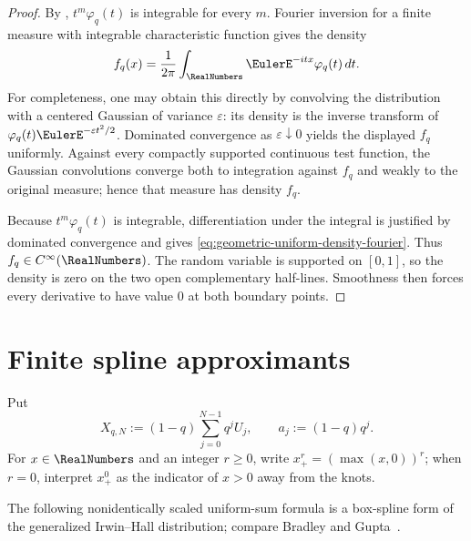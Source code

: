 \documentclass[11pt,a4paper,oneside,openany]{book}
\theoremstyle{definition}
\theoremstyle{remark}
\begin{document}
\begin{proof}
By , $t^m\varphi_q(t)$ is integrable for every $m$.  Fourier inversion for a finite measure with integrable characteristic function gives the density
\[
 f_q(x)=\frac1{2\pi}\int_{\RealNumbers}\EulerE^{-itx}\varphi_q(t)\,dt.
\]
For completeness, one may obtain this directly by convolving the distribution with a centered Gaussian of variance $\varepsilon$: its density is the inverse transform of
$\varphi_q(t)\EulerE^{-\varepsilon t^2/2}$.  Dominated convergence as
$\varepsilon\downarrow0$ yields the displayed $f_q$ uniformly.  Against every compactly supported continuous test function, the Gaussian convolutions converge both to integration against $f_q$ and weakly to the original measure; hence that measure has density $f_q$.

Because $t^m\varphi_q(t)$ is integrable, differentiation under the integral is justified by dominated convergence and gives \eqref{eq:geometric-uniform-density-fourier}.  Thus $f_q\in C^\infty(\RealNumbers)$.  The random variable is supported on $[0,1]$, so the density is zero on the two open complementary half-lines.  Smoothness then forces every derivative to have value $0$ at both boundary points.
\end{proof}

\section{Finite spline approximants}

Put
\begin{equation}\label{eq:finite-geometric-uniform-sum}
 X_{q,N}:=(1-q)\sum_{j=0}^{N-1}q^jU_j,
 \qquad
 a_j:=(1-q)q^j.
\end{equation}
For $x\in\RealNumbers$ and an integer $r\ge0$, write
$x_+^r=(\max(x,0))^r$; when $r=0$, interpret $x_+^0$ as the indicator of $x>0$ away from the knots.

The following nonidentically scaled uniform-sum formula is a box-spline form of the generalized Irwin--Hall distribution; compare Bradley and Gupta~\cite{BradleyGupta2004}.

\end{document}
